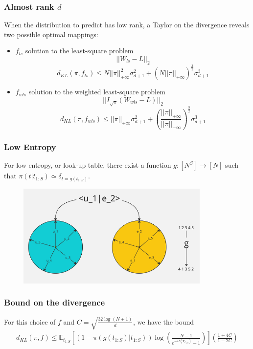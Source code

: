 \documentclass{beamer}
\begin{document}
\begin{frame}
    \frametitle{Almost rank $d$}
    When the distribution to predict has low rank, a Taylor on the divergence reveals two possible optimal mappings:
    \pause
    \begin{itemize}
        \item $f_{ls}$ solution to the least-square problem \[||W_{ls} - L||_2\] 
        \[d_{KL}(\pi, f_{ls}) \leq N||\pi||_{+\infty}^2\sigma_{d+1}^2
        + (N||\pi||_{+\infty})^{\frac{3}{2}}\sigma_{d+1}^3\]
        \pause
        \item $f_{wls}$ solution to the weighted least-square problem \[||I_{\sqrt{\pi}}(W_{wls} - L)||_2\]
        \[d_{KL}(\pi, f_{wls}) \leq ||\pi||_{+\infty}\sigma_{d+1}^2
        + \left(\frac{||\pi||_{+\infty}}{||\pi||_{-\infty}}\right)^{\frac{3}{2}}\sigma_{d+1}^3\]
    \end{itemize}
    
\end{frame}

\begin{frame}
    \frametitle{Low Entropy}
    For low entropy, or look-up table, there exist a function $g:[N^S]\rightarrow[N]$ such that
    $\pi(t|t_{1:S}) \simeq \delta_{t=g(t_{1:S})}$.
    \pause
    \begin{figure}
        \includegraphics[width = 0.85\textwidth]{Low entropy.jpg}
    \end{figure}

\end{frame}

\begin{frame}
    \frametitle{Bound on the divergence}
    \begin{theorem}
        For this choice of $f$ and $C = \sqrt{\frac{32\log(N+1)}{d}}$, we have the bound
        \begin{equation*}
            \begin{split}
                d_{KL}(\pi, f) \leq \mathbb{E}_{t_{1:S}}\left[(1-\pi(g(t_{1:S})|t_{1:S}))\log\left(\frac{N-1}{e^{-H(\pi_{t_{1:S}})}-1}\right) \right]\left(\frac{1+4C}{1-2C}\right)
            \end{split}
        \end{equation*}
    \end{theorem}
\end{frame}
\end{document}

